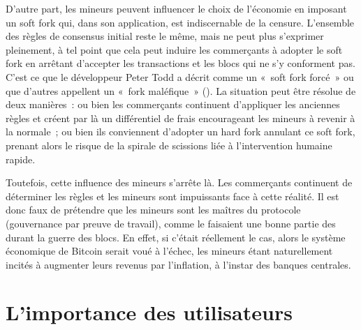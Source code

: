 D'autre part, les mineurs peuvent influencer le choix de l'économie en imposant un soft fork qui, dans son application, est indiscernable de la censure. L'ensemble des règles de consensus initial reste le même, mais ne peut plus s'exprimer pleinement, à tel point que cela peut induire les commerçants à adopter le soft fork en arrêtant d'accepter les transactions et les blocs qui ne s'y conforment pas. C'est ce que le développeur Peter Todd a décrit comme un «~soft fork forcé~» ou que d'autres appellent un «~fork maléfique~» (). La situation peut être résolue de deux manières~: ou bien les commerçants continuent d'appliquer les anciennes règles et créent par là un différentiel de frais encourageant les mineurs à revenir à la normale~; ou bien ils conviennent d'adopter un hard fork annulant ce soft fork, prenant alors le risque de la spirale de scissions liée à l'intervention humaine rapide.

Toutefois, cette influence des mineurs s'arrête là. Les commerçants continuent de déterminer les règles et les mineurs sont impuissants face à cette réalité. Il est donc faux de prétendre que les mineurs sont les maîtres du protocole (gouvernance par preuve de travail), comme le faisaient une bonne partie des  durant la guerre des blocs. En effet, si c'était réellement le cas, alors le système économique de Bitcoin serait voué à l'échec, les mineurs étant naturellement incités à augmenter leurs revenus par l'inflation, à l'instar des banques centrales.

\section*{L'importance des utilisateurs}

